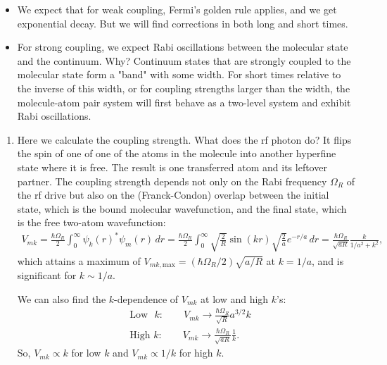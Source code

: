 \documentclass{article}
\theoremstyle{definition}
\newcommand{\f}[2]{\frac{#1}{#2}}
\begin{document}
\begin{itemize}
 \item We expect that for weak coupling, Fermi's golden rule applies, and we get exponential decay. But we will find corrections in both long and short times. 
 
 \item For strong coupling, we expect Rabi oscillations between the molecular state and the continuum. Why? Continuum states that are strongly coupled to the molecular state form a "band" with some width. For short times relative to the inverse of this width, or for coupling strengths larger than the width, the molecule-atom pair system will first behave as a two-level system and exhibit Rabi oscillations.
 
 
\end{itemize}


\begin{enumerate}[label=(\alph*)]

\item Here we calculate the coupling strength. What does the rf photon do? It flips the spin of one of one of the atoms in the molecule into another hyperfine state where it is free. The result is one transferred atom and its leftover partner. The coupling strength depends not only on the Rabi frequency $\Omega_R$ of the rf drive but also on the (Franck-Condon) overlap between the initial state, which is the bound molecular wavefunction, and the final state, which is the free two-atom wavefunction:
\begin{align*}
V_{mk} = 
\f{\hbar \Omega_R}{2} \int_0^\infty \psi_k(r)^* \psi_m(r)\,dr =  
\f{\hbar \Omega_R}{2} \int_0^\infty \sqrt{\f{2}{R}} \sin(kr) \sqrt{\f{2}{a}} e^{-r/a}\,dr = 
\f{\hbar \Omega_R}{ \sqrt{aR}} \f{k}{1/a^2 + k^2},
\end{align*}
which attains a maximum of $V_{mk,\text{max}} = (\hbar \Omega_R/2)\sqrt{a/R}$ at $k=1/a$, and is significant for $k \sim 1/a$. 

We can also find the $k$-dependence of $V_{mk}$ at low and high $k$'s:
\begin{align*}
&\text{Low } \,\, k: \quad\quad V_{mk} \to \f{\hbar \Omega_R}{\sqrt{R}} a^{3/2} k \\ 
&\text{High } k: \quad\quad V_{mk} \to \f{\hbar \Omega_R}{\sqrt{aR}} \f{1}{k}.
\end{align*}
So, $V_{mk} \propto k$ for low $k$ and $V_{mk} \propto 1/k$ for high $k$.


\end{enumerate}
\end{document}
